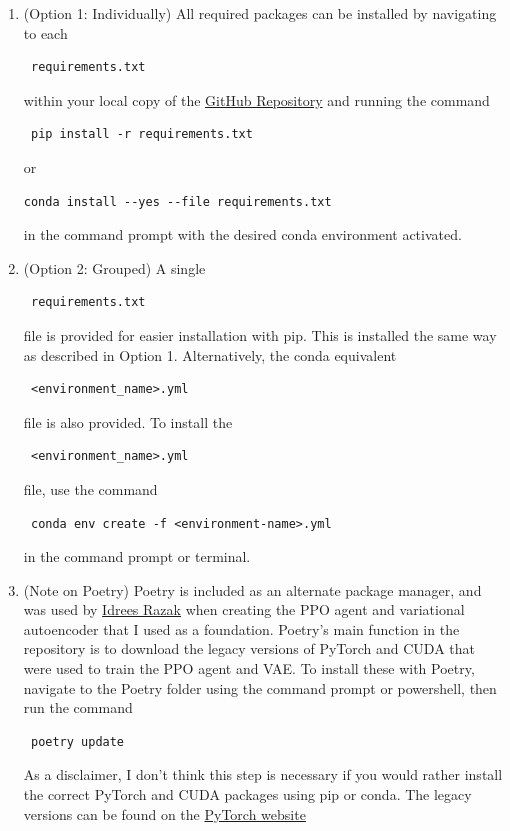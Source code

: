 \documentclass{article}
\begin{document}
\begin{enumerate}
\item(Option 1: Individually) All required packages can be installed by navigating to each \begin{verbatim} requirements.txt \end{verbatim} within your local copy of the \href{https://github.com/hrwhite21/RL_CARLA_ADAS}{GitHub Repository} and running the command \begin{verbatim} pip install -r requirements.txt \end{verbatim} or \begin{verbatim}conda install --yes --file requirements.txt \end{verbatim} in the command prompt with the desired conda environment activated.
\item(Option 2: Grouped) A single \begin{verbatim} requirements.txt \end{verbatim} file is provided for easier installation with pip. This is installed the same way as described in Option 1. Alternatively, the conda equivalent \begin{verbatim} <environment_name>.yml \end{verbatim} file is also provided. To install the \begin{verbatim} <environment_name>.yml \end{verbatim} file, use the command \begin{verbatim} conda env create -f <environment-name>.yml \end{verbatim} in the command prompt or terminal.
\item(Note on Poetry) Poetry is included as an alternate package manager, and was used by \href{https://github.com/idreesshaikh}{Idrees Razak} when creating the PPO agent and variational autoencoder that I used as a foundation. Poetry's main function in the repository is to download the legacy versions of PyTorch and CUDA that were used to train the PPO agent and VAE. To install these with Poetry, navigate to the Poetry folder using the command prompt or powershell, then run the command \begin{verbatim} poetry update \end{verbatim} As a disclaimer, I don't think this step is necessary if you would rather install the correct PyTorch and CUDA packages using pip or conda. The legacy versions can be found on the \href{https://pytorch.org/get-started/previous-versions/}{PyTorch website}
\end{enumerate} 
\end{document}
